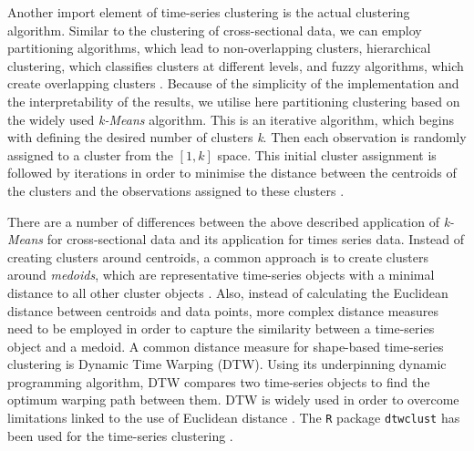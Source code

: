 \documentclass[]{interact}
\theoremstyle{plain}%
\theoremstyle{definition}
\theoremstyle{remark}
\begin{document}
Another import element of time-series clustering is the actual
clustering algorithm. Similar to the clustering of cross-sectional data,
we can employ partitioning algorithms, which lead to non-overlapping
clusters, hierarchical clustering, which classifies clusters at
different levels, and fuzzy algorithms, which create overlapping
clusters \citep{sardatime}. Because of the simplicity of the
implementation and the interpretability of the results, we utilise here
partitioning clustering based on the widely used \emph{k-Means}
algorithm. This is an iterative algorithm, which begins with defining
the desired number of clusters \emph{k}. Then each observation is
randomly assigned to a cluster from the \([1,k]\) space. This initial
cluster assignment is followed by iterations in order to minimise the
distance between the centroids of the clusters and the observations
assigned to these clusters \citep{james2013introduction}.

There are a number of differences between the above described
application of \emph{k-Means} for cross-sectional data and its
application for times series data. Instead of creating clusters around
centroids, a common approach is to create clusters around
\emph{medoids}, which are representative time-series objects with a
minimal distance to all other cluster objects \citep{sardatime}. Also,
instead of calculating the Euclidean distance between centroids and data
points, more complex distance measures need to be employed in order to
capture the similarity between a time-series object and a medoid. A
common distance measure for shape-based time-series clustering is
Dynamic Time Warping (DTW). Using its underpinning dynamic programming
algorithm, DTW compares two time-series objects to find the optimum
warping path between them. DTW is widely used in order to overcome
limitations linked to the use of Euclidean distance
\citep{sardatime, berndt1994using, ratanamahatana2004everything}. The
\texttt{R} package \texttt{dtwclust} has been used for the time-series
clustering \citep{dtwclust}.
\end{document}
